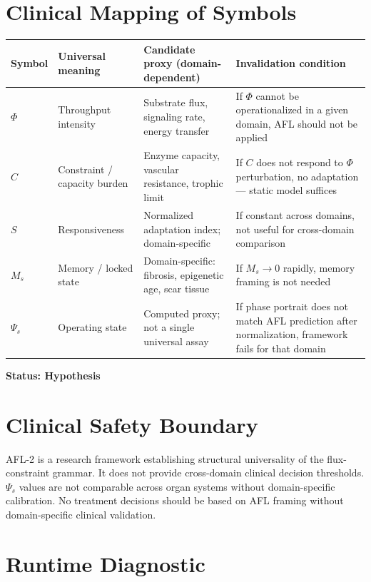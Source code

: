 \documentclass[11pt]{article}
\begin{document}
\section{Clinical Mapping of Symbols}

\begin{center}
\begin{tabular}{p{1.5cm}p{3.0cm}p{3.8cm}p{4.5cm}}
\toprule
Symbol & Universal meaning & Candidate proxy (domain-dependent) & Invalidation condition \\
\midrule
$\Phi$ & Throughput intensity & Substrate flux, signaling rate, energy transfer & If $\Phi$ cannot be operationalized in a given domain, AFL should not be applied \\
$C$ & Constraint / capacity burden & Enzyme capacity, vascular resistance, trophic limit & If $C$ does not respond to $\Phi$ perturbation, no adaptation — static model suffices \\
$S$ & Responsiveness & Normalized adaptation index; domain-specific & If constant across domains, not useful for cross-domain comparison \\
$M_s$ & Memory / locked state & Domain-specific: fibrosis, epigenetic age, scar tissue & If $M_s \to 0$ rapidly, memory framing is not needed \\
$\Psi_s$ & Operating state & Computed proxy; not a single universal assay & If phase portrait does not match AFL prediction after normalization, framework fails for that domain \\
\bottomrule
\end{tabular}
\end{center}

\textbf{Status: Hypothesis}

\section{Clinical Safety Boundary}

AFL-2 is a research framework establishing structural universality of the flux-constraint grammar. It does not provide cross-domain clinical decision thresholds. $\Psi_s$ values are not comparable across organ systems without domain-specific calibration. No treatment decisions should be based on AFL framing without domain-specific clinical validation.

\section{Runtime Diagnostic}
\end{document}
